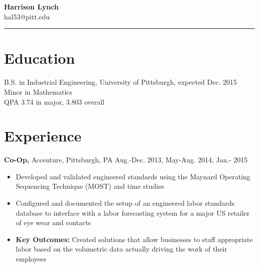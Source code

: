 \documentclass[margin]{res}
\begin{document}
 
 
\begin{flushleft}

\textbf{\LARGE{Harrison Lynch}} \\
\small{hal53@pitt.edu} \vspace{2.5mm} \\
\rule{132mm}{0.2}
\vspace{-16mm}


\end{flushleft}

\begin{resume} 
 

\section{Education} 
B.S. in Industrial Engineering, University of Pittsburgh, expected Dec. 2015 \\
Minor in Mathematics \\
QPA 3.74 in major, 3.803 overall

 
\section{Experience}
 {\bf Co-Op,} Accenture, Pittsburgh, PA \hfill Aug.-Dec. 2013, May-Aug. 2014, Jan.- 2015
 \begin{itemize} \itemsep -2pt  %
 \item Developed and validated engineered standards using the Maynard Operating Sequencing Technique (MOST) and time studies
 \item Configured and documented the setup of an engineered labor standards database to interface with a labor forecasting system for a major US retailer of eye wear and contacts
 \item \textbf{Key Outcomes:} Created solutions that allow businesses to staff appropriate labor based on the volumetric data actually driving the work of their employees
 \end{itemize}




\end{resume}
\end{document}

